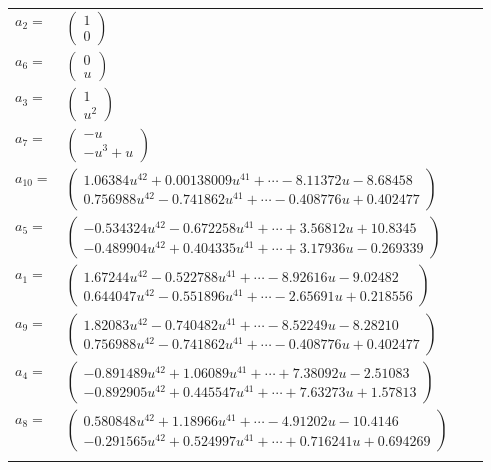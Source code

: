\documentclass[1p]{elsarticle_modified}
\theoremstyle{definition}
\begin{document}
\begin{tabular}{m{7pt} m{180pt} m{7pt} m{180pt} }
\flushright $a_{2}=$&$\begin{pmatrix}1\\0\end{pmatrix}$ \\
\flushright $a_{6}=$&$\begin{pmatrix}0\\u\end{pmatrix}$ \\
\flushright $a_{3}=$&$\begin{pmatrix}1\\u^2\end{pmatrix}$ \\
\flushright $a_{7}=$&$\begin{pmatrix}- u\\- u^3+u\end{pmatrix}$ \\
\flushright $a_{10}=$&$\begin{pmatrix}1.06384 u^{42}+0.00138009 u^{41}+\cdots-8.11372 u-8.68458\\0.756988 u^{42}-0.741862 u^{41}+\cdots-0.408776 u+0.402477\end{pmatrix}$ \\
\flushright $a_{5}=$&$\begin{pmatrix}-0.534324 u^{42}-0.672258 u^{41}+\cdots+3.56812 u+10.8345\\-0.489904 u^{42}+0.404335 u^{41}+\cdots+3.17936 u-0.269339\end{pmatrix}$ \\
\flushright $a_{1}=$&$\begin{pmatrix}1.67244 u^{42}-0.522788 u^{41}+\cdots-8.92616 u-9.02482\\0.644047 u^{42}-0.551896 u^{41}+\cdots-2.65691 u+0.218556\end{pmatrix}$ \\
\flushright $a_{9}=$&$\begin{pmatrix}1.82083 u^{42}-0.740482 u^{41}+\cdots-8.52249 u-8.28210\\0.756988 u^{42}-0.741862 u^{41}+\cdots-0.408776 u+0.402477\end{pmatrix}$ \\
\flushright $a_{4}=$&$\begin{pmatrix}-0.891489 u^{42}+1.06089 u^{41}+\cdots+7.38092 u-2.51083\\-0.892905 u^{42}+0.445547 u^{41}+\cdots+7.63273 u+1.57813\end{pmatrix}$ \\
\flushright $a_{8}=$&$\begin{pmatrix}0.580848 u^{42}+1.18966 u^{41}+\cdots-4.91202 u-10.4146\\-0.291565 u^{42}+0.524997 u^{41}+\cdots+0.716241 u+0.694269\end{pmatrix}$\\&\end{tabular}
\end{document}
